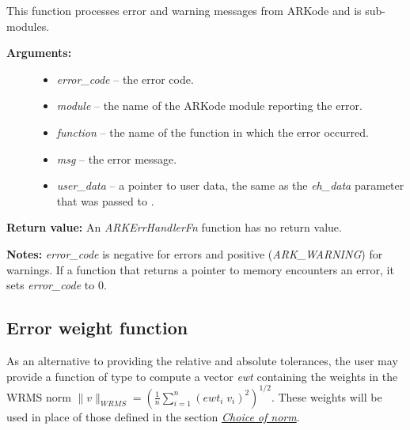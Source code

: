 \documentclass[letterpaper,10pt,english]{sphinxmanual}
\begin{document}
\begin{fulllineitems}
\label{c_interface/User_supplied:ARKErrHandlerFn}
This function processes error and warning messages from
ARKode and is sub-modules.
\begin{description}
\item[{\textbf{Arguments:}}] \leavevmode\begin{itemize}
\item {} 
\emph{error\_code} -- the error code.

\item {} 
\emph{module} -- the name of the ARKode module reporting the error.

\item {} 
\emph{function} -- the name of the function in which the error occurred.

\item {} 
\emph{msg} -- the error message.

\item {} 
\emph{user\_data} -- a pointer to user data, the same as the
\emph{eh\_data} parameter that was passed to {\hyperref[c_interface/User_callable:ARKodeSetErrHandlerFn]{}}.

\end{itemize}

\end{description}

\textbf{Return value:}
An \emph{ARKErrHandlerFn} function has no return value.

\textbf{Notes:} \emph{error\_code} is negative for errors and positive
(\emph{ARK\_WARNING}) for warnings.  If a function that returns a
pointer to memory encounters an error, it sets \emph{error\_code} to
0.

\end{fulllineitems}



\subsection{Error weight function}
\label{c_interface/User_supplied:cinterface-errorweight}\label{c_interface/User_supplied:error-weight-function}
As an alternative to providing the relative and absolute tolerances,
the user may provide a function of type {\hyperref[c_interface/User_supplied:ARKEwtFn]{}} to compute a
vector \emph{ewt} containing the weights in the WRMS norm
$\|v\|_{WRMS} = \left(\frac{1}{n} \sum_{i=1}^n \left(ewt_i\; v_i\right)^2
\right)^{1/2}$.  These weights will be used in place of those defined
in the section {\hyperref[Mathematics:mathematics-error-norm]{\emph{Choice of norm}}}.
\end{document}
